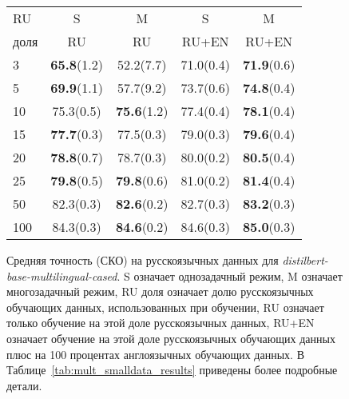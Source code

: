 \begin{figure}[!htbp]
\begin{minipage}{0.4\textwidth}
{{\begin{tabular}[baseline={(0,2.1)}]{|l||c|c|c|c|}
\hline
RU & S & M & S & M\\
доля & RU & RU & RU+EN & RU+EN \\ %
\hline
3 & \textbf{65.8}(1.2) & 52.2(7.7) & 71.0(0.4) & \textbf{71.9}(0.6)\\
5 & \textbf{69.9}(1.1) & 57.7(9.2) & 73.7(0.6) & \textbf{74.8}(0.4)\\
10 & 75.3(0.5) & \textbf{75.6}(1.2) & 77.4(0.4) & \textbf{78.1}(0.4)\\
15 & \textbf{77.7}(0.3) & 77.5(0.3) & 79.0(0.3) & \textbf{79.6}(0.4)\\
20 & \textbf{78.8}(0.7) & 78.7(0.3) & 80.0(0.2) & \textbf{80.5}(0.4)\\
25 & \textbf{79.8}(0.5) & \textbf{79.8}(0.6) & 81.0(0.2) & \textbf{81.4}(0.4)\\
50 & 82.3(0.3) & \textbf{82.6}(0.2) & 82.7(0.3) & \textbf{83.2}(0.3)\\
100 & 84.3(0.3) & \textbf{84.6}(0.2) & 84.6(0.3) & \textbf{85.0}(0.3)\\ \hline
\end{tabular}}
}
\end{minipage}
\caption{Средняя точность (СКО) на русскоязычных данных для \textit{distilbert-base-multilingual-cased}. S означает однозадачный режим, M означает многозадачный режим, RU доля означает долю русскоязычных обучающих данных, использованных при обучении, RU означает только обучение на этой доле русскоязычных данных, RU+EN означает обучение на этой доле русскоязычных обучающих данных плюс на 100 процентах англоязычных обучающих данных. В Таблице~\ref{tab:mult_smalldata_results} приведены более подробные детали.}
\label{fig:tr-ag:ru_dialog_part}
\end{figure}
%

